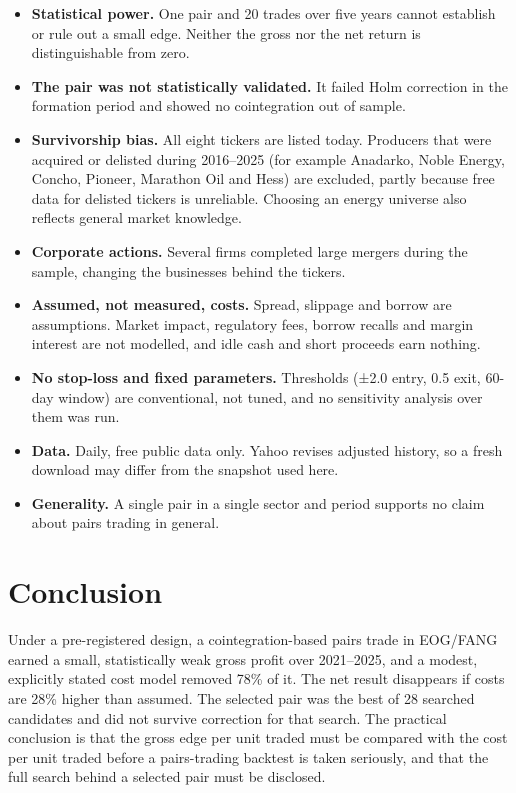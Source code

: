 \documentclass[11pt]{article}
\providecommand{\tightlist}{\setlength{\itemsep}{0pt}\setlength{\parskip}{0pt}}
\begin{document}
\begin{itemize}
\tightlist
\item
  \textbf{Statistical power.} One pair and 20 trades over five years cannot
  establish or rule out a small edge. Neither the gross nor the net return
  is distinguishable from zero.
\item
  \textbf{The pair was not statistically validated.} It failed Holm correction
  in the formation period and showed no cointegration out of sample.
\item
  \textbf{Survivorship bias.} All eight tickers are listed today. Producers that
  were acquired or delisted during 2016--2025 (for example Anadarko, Noble
  Energy, Concho, Pioneer, Marathon Oil and Hess) are excluded, partly
  because free data for delisted tickers is unreliable. Choosing an energy
  universe also reflects general market knowledge.
\item
  \textbf{Corporate actions.} Several firms completed large mergers during the
  sample, changing the businesses behind the tickers.
\item
  \textbf{Assumed, not measured, costs.} Spread, slippage and borrow are
  assumptions. Market impact, regulatory fees, borrow recalls and margin
  interest are not modelled, and idle cash and short proceeds earn nothing.
\item
  \textbf{No stop-loss and fixed parameters.} Thresholds (±2.0 entry, 0.5 exit,
  60-day window) are conventional, not tuned, and no sensitivity analysis
  over them was run.
\item
  \textbf{Data.} Daily, free public data only. Yahoo revises adjusted history,
  so a fresh download may differ from the snapshot used here.
\item
  \textbf{Generality.} A single pair in a single sector and period supports no
  claim about pairs trading in general.
\end{itemize}

\hypertarget{conclusion}{%
\section{Conclusion}\label{conclusion}}

Under a pre-registered design, a cointegration-based pairs trade in
EOG/FANG earned a small, statistically weak gross profit over 2021--2025,
and a modest, explicitly stated cost model removed 78\% of it. The net
result disappears if costs are 28\% higher than assumed. The selected pair
was the best of 28 searched candidates and did not survive correction for
that search. The practical conclusion is that the gross edge per unit
traded must be compared with the cost per unit traded before a
pairs-trading backtest is taken seriously, and that the full search
behind a selected pair must be disclosed.
\end{document}
